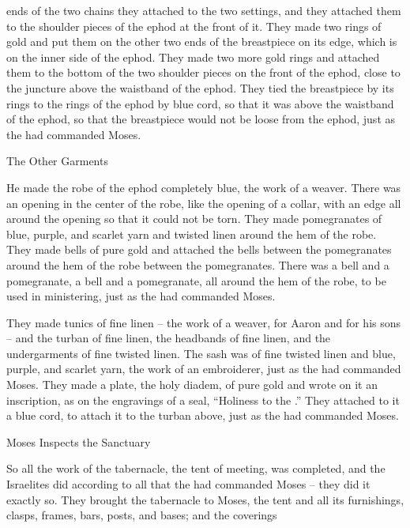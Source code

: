 {ends
of the two
chains
they attached
to the two
settings,
and they attached them
to the shoulder pieces
of the ephod
at the front of it.
They made
two
rings
of gold
and put
them on
the other two
ends
of the breastpiece
on
its edge,
which
is on the inner side
of the ephod.
They made
two
more gold
rings
and attached them
to the bottom
of the two
shoulder pieces
on the front
of the
ephod,
close
to the juncture
above
the waistband
of the ephod.
They tied
the breastpiece
by its rings
to
the rings
of the ephod
by blue
cord,
so that it was
above
the waistband
of the ephod,
so that the breastpiece
would not
be loose
from
the ephod,
just
as the
{}
had commanded
Moses.
\par }{\SH The Other Garments
\par }{\PP {}He made
the robe
of the ephod
completely
blue,
the work
of a weaver.
There was an opening
in the center
of the robe,
like the opening
of a collar,
with an edge
all around
the opening
so that it could not
be torn.
They made
pomegranates
of blue,
purple,
and scarlet
yarn
and twisted linen
around the hem
of the robe.
They made
bells
of pure
gold
and attached
the bells
between the pomegranates
around
the hem
of the robe
between the pomegranates.
There was a bell
and a pomegranate,
a bell
and a pomegranate,
all around
the hem
of the robe,
to be used in ministering,
just
as the
{}
had commanded
Moses.
\par }{\PP {}They made
tunics
of fine linen
– the work
of a weaver,
for Aaron
and for his sons –
and the turban
of fine linen,
the headbands
of fine linen,
and the undergarments
of fine
twisted
linen.
The sash
was of fine
twisted
linen
and blue,
purple,
and scarlet
yarn,
the work
of an embroiderer,
just
as the
{}
had commanded
Moses.
They made
a plate,
the holy
diadem,
of pure
gold
and wrote
on
it an inscription,
as on the engravings
of a seal,
“Holiness
to the
{}.”
They attached
to
it a blue
cord,
to attach
it to
the turban
above,
just
as the
{}
had commanded
Moses.
\par }{\SH Moses Inspects the Sanctuary
\par }{\PP {}So all
the work
of the tabernacle,
the tent
of meeting,
was completed,
and the Israelites
did
according to all
that
the {}
had commanded
Moses
– they did it
exactly so.
They brought
the tabernacle
to
Moses,
the tent
and all
its furnishings,
clasps,
frames,
bars,
posts,
and bases;
and the coverings
}
